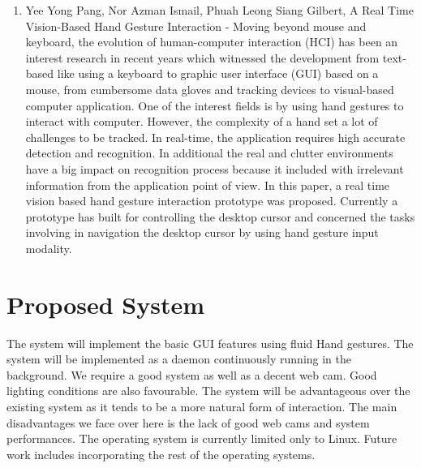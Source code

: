 \documentclass[11pt]{report}
\begin{document}
\begin{enumerate}
    \item Yee Yong Pang, Nor Azman Ismail, Phuah Leong Siang Gilbert, A Real Time Vision-Based Hand Gesture Interaction \cite{10} - Moving  beyond  mouse  and  keyboard,  the  evolution of human-computer interaction (HCI) has been an interest research in recent years which witnessed the development from text-based  like  using  a  keyboard  to  graphic  user  interface (GUI)  based  on  a  mouse,  from  cumbersome  data  gloves  and tracking devices to visual-based computer application. One of the  interest  fields  is  by  using  hand  gestures  to  interact  with computer.  However,  the  complexity  of  a  hand  set  a  lot  of challenges to be tracked. In real-time, the application requires high accurate detection and recognition. In additional the real and  clutter  environments  have  a  big  impact  on  recognition process  because  it  included  with  irrelevant  information  from the   application   point   of   view.   In   this   paper,   a   real   time vision based hand gesture interaction prototype was proposed. Currently  a  prototype  has  built  for  controlling  the  desktop cursor  and  concerned  the  tasks  involving  in  navigation  the desktop  cursor  by  using  hand  gesture  input  modality.

\end{enumerate}

\section{Proposed System}


The system will implement the basic GUI features using fluid Hand gestures. The system will be implemented as a daemon continuously running in the background. We require a good system as well as a decent web cam. Good lighting conditions are also favourable.
The system will be advantageous over the existing system as it tends to be a more natural form of interaction. 
The main disadvantages we face over here is the lack of good web cams and system performances. The operating system is currently limited only to Linux. Future work includes incorporating the rest of the operating systems. 
\end{document}
